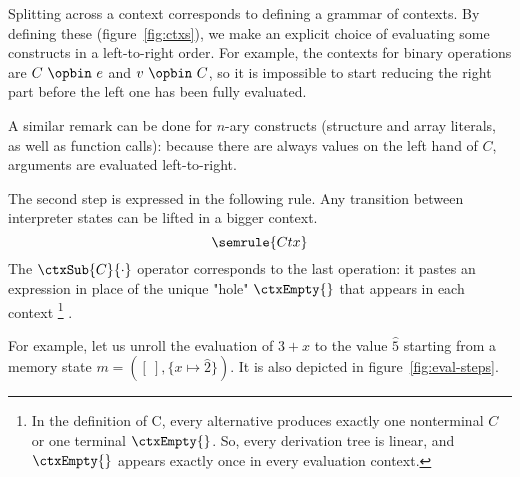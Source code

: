 Splitting across a context corresponds to defining a grammar of contexts. By
defining these (figure~\ref{fig:ctxs}), we make an explicit choice of evaluating some constructs in a
left-to-right order. For example, the contexts for binary operations are
$C~\opbin~e$ and $v~\opbin~C$, so it is impossible to start reducing the right
part before the left one has been fully evaluated.


A similar remark can be done for $n$-ary constructs (structure and array
literals, as well as function calls): because there are always values on the
left hand of $C$, arguments are evaluated left-to-right.

The second step is expressed in the following rule. Any transition between
interpreter states can be lifted in a bigger context.%
{\small \[
    \semrule{Ctx}
\]}%
The $\ctxSub{C}{\cdot}$ operator corresponds to the last operation: it pastes an
expression in place of the unique "hole" $\ctxEmpty{}$ that appears in each
context \footnote{ In the definition of C, every alternative produces exactly
  one nonterminal $C$ or one terminal $\ctxEmpty{}$. So, every derivation tree
is linear, and $\ctxEmpty{}$ appears exactly once in every evaluation context. }
.

For example, let us unroll the evaluation of
$3+x$ to the value $\widehat{5}$
starting from a memory state $m = ([~], \{x ↦ \widehat{2}\}) $.
It is also depicted in figure~\ref{fig:eval-steps}.


